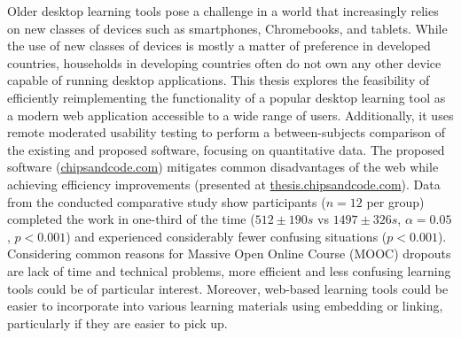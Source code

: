 Older desktop learning tools pose a challenge in a world that increasingly relies on new classes of devices such as smartphones, Chromebooks, and tablets.
While the use of new classes of devices is mostly a matter of preference in developed countries, households in developing countries often do not own any other device capable of running desktop applications.
This thesis explores the feasibility of efficiently reimplementing the functionality of a popular desktop learning tool as a modern web application accessible to a wide range of users.
Additionally, it uses remote moderated usability testing to perform a between-subjects comparison of the existing and proposed software, focusing on quantitative data.
The proposed software (\href{https://chipsandcode.com}{chipsandcode.com}) mitigates common disadvantages of the web while achieving efficiency improvements (presented at \href{https://thesis.chipsandcode.com}{thesis.chipsandcode.com}).
Data from the conducted comparative study show participants ($n=12$ per group) completed the work in one-third of the time ($512 \pm190 s$ vs $1497 \pm326 s$, $\alpha=0.05$, $p<0.001$) and experienced considerably fewer confusing situations ($p<0.001$).
Considering common reasons for Massive Open Online Course (MOOC) dropouts are lack of time and technical problems, more efficient and less confusing learning tools could be of particular interest.
Moreover, web-based learning tools could be easier to incorporate into various learning materials using embedding or linking, particularly if they are easier to pick up.

\cleardoublepage
\rhead{\nouppercase{\rightmark}}

\setcounter{page}{1}
